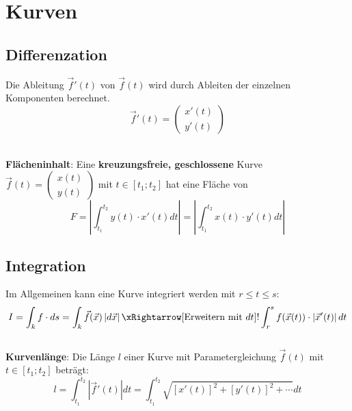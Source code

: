 \section{Kurven}
\subsection{Differenzation}
Die Ableitung $\vec{f}'(t)$ von $\vec{f}(t)$ wird durch Ableiten der einzelnen Komponenten berechnet.
\[
\vec{f}'(t) = \begin{pmatrix}
	x'(t) \\ y'(t)
\end{pmatrix}
\]

~\\
\textbf{Flächeninhalt}:
Eine \textbf{kreuzungsfreie, geschlossene} Kurve $\vec{f}(t) = \begin{pmatrix}
	x(t) \\ y(t)
\end{pmatrix}$ mit $t \in [t_1;t_2]$ hat eine Fläche von
\[
F = \left|\int_{t_1}^{t_2}y(t)\cdot x'(t)dt\right| = \left|\int_{t_1}^{t_2}x(t)\cdot y'(t)dt\right|\]


\subsection{Integration}
Im Allgemeinen kann eine Kurve integriert werden mit $r \leq t \leq s$:
\[
I = \int_{k}f\cdot ds = \int_{k}\vec{f}(\vec{x})\left|d\vec{x}\right| \xRightarrow[\text{Erweitern mit } dt]{!} \int_{r}^{s}f(\vec{x}(t))\cdot \left|\vec{x}'(t)\right|dt
\]
~\\
\textbf{Kurvenlänge}:
Die Länge $l$ einer Kurve mit Parametergleichung $\vec{f}(t)$ mit $t \in [t_1;t_2]$ beträgt:
\[
l = \int_{t_1}^{t_2}\left|\vec{f}'(t)\right|dt = \int_{t_1}^{t_2}\sqrt{[x'(t)]^2 + [y'(t)]^2 + \cdots}dt
\]

